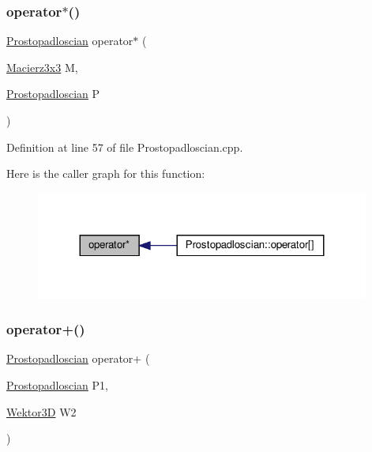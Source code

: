 \subsubsection{\texorpdfstring{operator$\ast$()}{operator*()}}
{\footnotesize\ttfamily \hyperlink{class_prostopadloscian}{Prostopadloscian} operator$\ast$ (\begin{DoxyParamCaption}\item[{\hyperlink{_macierz3x3_8hh_ad4fc7b0e263d9a99ba6174f68b52ea87}{Macierz3x3}}]{M,  }\item[{\hyperlink{class_prostopadloscian}{Prostopadloscian}}]{P }\end{DoxyParamCaption})}



Definition at line 57 of file Prostopadloscian.\+cpp.

Here is the caller graph for this function\+:\nopagebreak
\begin{figure}[H]
\begin{center}
\leavevmode
\includegraphics[width=311pt]{_prostopadloscian_8hh_a0c34886e02f7ad596e7ae26ef4bdc44f_icgraph}
\end{center}
\end{figure}
\mbox{\label{_prostopadloscian_8hh_aed7fb32f55c347f1ffbbdb209d41fa04}} 
\subsubsection{\texorpdfstring{operator+()}{operator+()}\hspace{0.1cm}{\footnotesize\ttfamily [1/2]}}
{\footnotesize\ttfamily \hyperlink{class_prostopadloscian}{Prostopadloscian} operator+ (\begin{DoxyParamCaption}\item[{\hyperlink{class_prostopadloscian}{Prostopadloscian}}]{P1,  }\item[{\hyperlink{_wektor3_d_8hh_ac353a272b38b4ad342f7181ad7bdb91a}{Wektor3D}}]{W2 }\end{DoxyParamCaption})}




